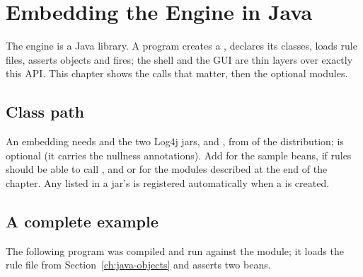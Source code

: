 \chapter{Embedding the Engine in Java}
\label{ch:embedding}

The engine is a Java library. A program creates a , declares its
classes, loads rule files, asserts objects and fires; the shell and the
GUI are thin layers over exactly this API. This chapter shows the calls
that matter, then the optional modules.

\section{Class path}

An embedding needs  and the two Log4j
jars,  and , from  of the
distribution;  is optional (it carries the nullness
annotations). Add  for the sample beans,
 if rules should be able to call , and
 or  for the modules
described at the end of the chapter. Any  listed in a
jar's  is
registered automatically when a  is created.

\section{A complete example}

The following program was compiled and run against the 
module; it loads the rule file from Section~\ref{ch:java-objects} and
asserts two  beans.

